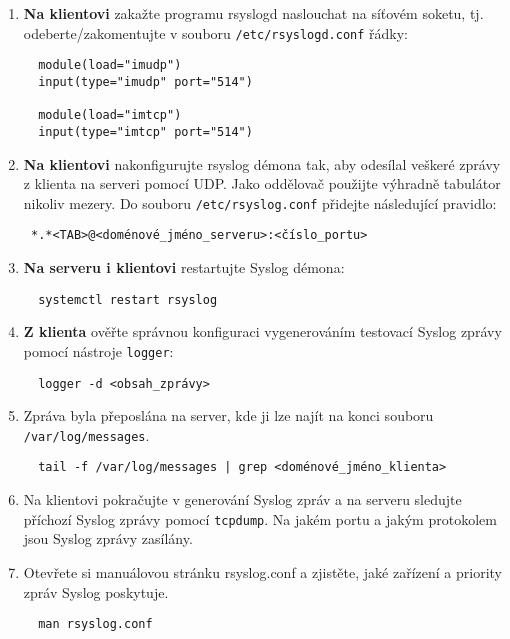 \begin{itemize}
\begin{enumerate}
            \item {\bf Na klientovi} zakažte programu rsyslogd naslouchat na síťovém soketu,
tj. odeberte/zakomentujte v souboru {\tt /etc/rsyslogd.conf} řádky:
\begin{verbatim}
  module(load="imudp")
  input(type="imudp" port="514")

  module(load="imtcp")
  input(type="imtcp" port="514")
\end{verbatim} 

            \item {\bf Na klientovi} nakonfigurujte rsyslog démona tak, aby odesílal veškeré zprávy
         z klienta na serveri pomocí UDP. Jako oddělovač použijte výhradně tabulátor nikoliv mezery.
         Do souboru {\tt /etc/rsyslog.conf} přidejte následující pravidlo:
\begin{verbatim} 
 *.*<TAB>@<doménové_jméno_serveru>:<číslo_portu>
\end{verbatim}

            \item {\bf Na serveru i klientovi} restartujte Syslog démona: 
\begin{verbatim}
  systemctl restart rsyslog
\end{verbatim} 

            \item {\bf Z klienta} ověřte správnou konfiguraci vygenerováním testovací Syslog 
         zprávy pomocí nástroje {\tt logger}:
\begin{verbatim} 
  logger -d <obsah_zprávy>
\end{verbatim} 
        
            \item Zpráva byla přeposlána na server, kde ji lze najít na konci souboru
         {\tt /var/log/messages}.

\begin{verbatim} 
  tail -f /var/log/messages | grep <doménové_jméno_klienta>
\end{verbatim} 

            \item  Na klientovi pokračujte v generování Syslog zpráv a 
         na serveru sledujte příchozí Syslog zprávy pomocí {\tt tcpdump}. Na jakém
         portu a jakým protokolem jsou Syslog zprávy zasílány.

            \item Otevřete si manuálovou stránku rsyslog.conf a zjistěte, jaké zařízení a priority
         zpráv Syslog poskytuje. 
\begin{verbatim} 
  man rsyslog.conf
\end{verbatim} 
        

\end{enumerate}
\end{itemize}
